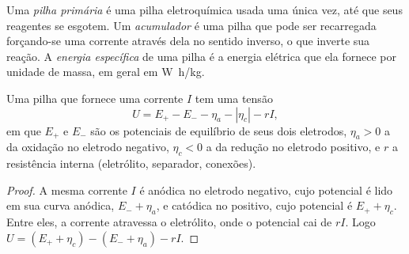 \begin{definition}[Baterias]\label{def:b2:batteries-electrolysis:battery}
Uma \emph{pilha primária} é uma pilha eletroquímica usada
uma única vez, até que seus reagentes se esgotem. Um \emph{acumulador}
é uma pilha que pode ser recarregada forçando-se uma corrente através dela no
sentido inverso, o que inverte sua reação. A \emph{energia
específica} de uma pilha é a energia elétrica que
ela fornece por unidade de massa, em geral em \unit{W.h/kg}.
\end{definition}

\begin{proposition}\label{prop:b2:batteries-electrolysis:delivering}
Uma pilha que fornece uma corrente $I$ tem uma tensão
\[
  U = E_+ - E_- - \eta_a - |\eta_c| - rI ,
\]
em que $E_+$ e $E_-$ são os potenciais de equilíbrio de seus dois eletrodos,
$\eta_a > 0$ a  da oxidação no eletrodo negativo,
$\eta_c < 0$ a da redução no eletrodo positivo, e $r$ a
resistência interna (eletrólito, separador, conexões).
\end{proposition}

\begin{proof}
A mesma corrente $I$ é anódica no eletrodo negativo, cujo potencial é lido
em sua curva anódica, $E_- + \eta_a$, e catódica no positivo, cujo potencial
é $E_+ + \eta_c$. Entre eles, a corrente atravessa o eletrólito, onde o
potencial cai de $rI$. Logo $U = (E_+ + \eta_c) - (E_- +
\eta_a) - rI$.
\end{proof}


